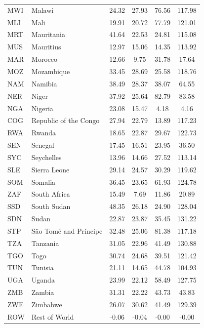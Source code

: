 \begin{center}
\begin{longtable}{llcccc}
  MWI & Malawi & 24.32 & 27.93 & 76.56 & 117.98 \\ 
  MLI & Mali & 19.91 & 20.72 & 77.79 & 121.01 \\ 
  MRT & Mauritania & 41.64 & 22.53 & 24.81 & 115.08 \\ 
  MUS & Mauritius & 12.97 & 15.06 & 14.35 & 113.92 \\ 
  MAR & Morocco & 12.66 & 9.75 & 31.78 & 17.64 \\ 
  MOZ & Mozambique & 33.45 & 28.69 & 25.58 & 118.76 \\ 
  NAM & Namibia & 38.49 & 28.37 & 38.07 & 64.55 \\ 
  NER & Niger & 37.92 & 25.64 & 82.79 & 83.58 \\ 
  NGA & Nigeria & 23.08 & 15.47 & 4.18 & 4.16 \\ 
  COG & Republic of the Congo & 27.94 & 22.79 & 13.89 & 117.23 \\ 
  RWA & Rwanda & 18.65 & 22.87 & 29.67 & 122.73 \\ 
  SEN & Senegal & 17.45 & 16.51 & 23.95 & 36.50 \\ 
  SYC & Seychelles & 13.96 & 14.66 & 27.52 & 113.14 \\ 
  SLE & Sierra Leone & 29.14 & 24.57 & 30.29 & 119.62 \\ 
  SOM & Somalia & 36.45 & 23.65 & 61.93 & 124.78 \\ 
  ZAF & South Africa & 15.49 & 7.69 & 11.86 & 20.89 \\ 
  SSD & South Sudan & 48.35 & 26.18 & 24.90 & 128.04 \\ 
  SDN & Sudan & 22.87 & 23.87 & 35.45 & 131.22 \\ 
  STP & São Tomé and Príncipe & 32.48 & 25.06 & 81.38 & 117.18 \\ 
  TZA & Tanzania & 31.05 & 22.96 & 41.49 & 130.88 \\ 
  TGO & Togo & 30.74 & 24.68 & 39.51 & 121.42 \\ 
  TUN & Tunisia & 21.11 & 14.65 & 44.78 & 104.93 \\ 
  UGA & Uganda & 23.99 & 22.12 & 58.49 & 127.75 \\ 
  ZMB & Zambia & 31.31 & 22.22 & 43.73 & 43.83 \\ 
  ZWE & Zimbabwe & 26.07 & 30.62 & 41.49 & 129.39 \\ 
  ROW & Rest of World & -0.06 & -0.04 & -0.00 & -0.00 \\ 

  \end{longtable}
	\endgroup
\end{center}

